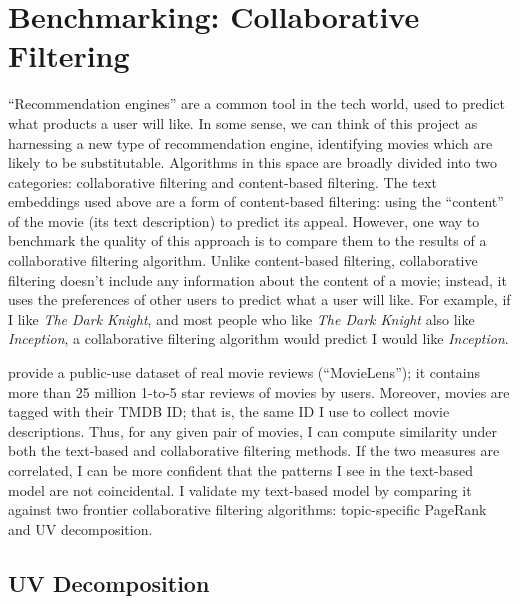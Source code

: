 \documentclass{article}
\begin{document}
\section{Benchmarking: Collaborative Filtering}

``Recommendation engines'' are a common tool in the tech world, used to predict what products a user will like. In some sense, we can think of this project as harnessing a new type of recommendation engine, identifying movies which are likely to be substitutable. Algorithms in this space are broadly divided into two categories: collaborative filtering and content-based filtering. The text embeddings used above are a form of content-based filtering: using the ``content'' of the movie (its text description) to predict its appeal. However, one way to benchmark the quality of this approach is to compare them to the results of a collaborative filtering algorithm. Unlike content-based filtering, collaborative filtering doesn't include any information about the content of a movie; instead, it uses the preferences of other users to predict what a user will like. For example, if I like \emph{The Dark Knight}, and most people who like \emph{The Dark Knight} also like \emph{Inception}, a collaborative filtering algorithm would predict I would like \emph{Inception}. 

\textcite{harper2016ATIIS} provide a public-use dataset of real movie reviews (``MovieLens''); it contains more than 25 million 1-to-5 star reviews of movies by users. Moreover, movies are tagged with their TMDB ID; that is, the same ID I use to collect movie descriptions. Thus, for any given pair of movies, I can compute similarity under both the text-based and collaborative filtering methods. If the two measures are correlated, I can be more confident that the patterns I see in the text-based model are not coincidental. I validate my text-based model by comparing it against two frontier collaborative filtering algorithms: topic-specific PageRank and UV decomposition.

\subsection{UV Decomposition}
\end{document}
